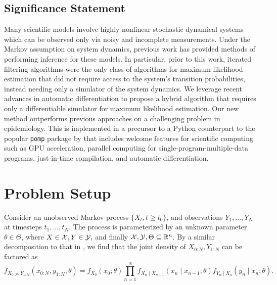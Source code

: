 \documentclass{article}
\begin{document}

\subsection{Significance Statement}
Many scientific models involve highly nonlinear stochastic dynamical systems which can be observed only via noisy and incomplete measurements. Under the Markov assumption on system dynamics, previous work has provided methods of performing inference for these models. In particular, prior to this work, iterated filtering algorithms were the only class of algorithms for maximum likelihood estimation that did not require access to the system's transition probabilities, instead needing only a simulator of the system dynamics. We leverage recent advances in automatic differentiation to propose a hybrid algorithm that requires only a differentiable simulator for maximum likelihood estimation. Our new method outperforms previous approaches on a challenging problem in epidemiology. This is implemented in a precursor to a Python counterpart to the popular \texttt{pomp} package by \citet{king16, king2017pompmanual} that includes welcome features for scientific computing such as GPU acceleration, parallel computing for single-program-multiple-data programs, just-in-time compilation, and automatic differentiation.


\section{Problem Setup}

Consider an unobserved Markov process $\{X_t, t \geq t_0\}$, and observations $Y_1,...,Y_N$ at timesteps $t_1,..., t_N$. The process is parameterized by an unknown parameter $\theta \in \Theta$, where $X \in {\mathcal{X}}, Y \in {\mathcal{Y}},$ and finally ${\mathcal{X}}, {\mathcal{Y}}, \Theta \subseteq \mathbb{R}^n$. By a similar decomposition to that in \citet{doucet2009tutorial}, we find that the joint density of $X_{0:N}, Y_{1:N}$ can be factored as
$$f_{X_{0: N}, Y_{1: N}}\left(x_{0: N}, y_{1: N} ; \theta\right)=f_{X_0}\left(x_0 ; \theta\right) \prod_{n=1}^N f_{X_n \mid X_{n-1}}\left(x_n \mid x_{n-1} ; \theta\right) f_{Y_n \mid X_n}\left(y_n \mid x_n ; \theta\right).$$
\end{document}
